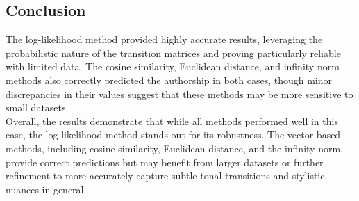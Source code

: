 \documentclass[12pt]{article}
\begin{document}
\subsection*{Conclusion}
The log-likelihood method provided highly accurate results, leveraging the probabilistic nature of the transition matrices and proving particularly reliable with limited data. The cosine similarity, Euclidean distance, and infinity norm methods also correctly predicted the authorship in both cases, though minor discrepancies in their values suggest that these methods may be more sensitive to small datasets.
\\
Overall, the results demonstrate that while all methods performed well in this case, the log-likelihood method stands out for its robustness. The vector-based methods, including cosine similarity, Euclidean distance, and the infinity norm, provide correct predictions but may benefit from larger datasets or further refinement to more accurately capture subtle tonal transitions and stylistic nuances in general.
\end{document}
